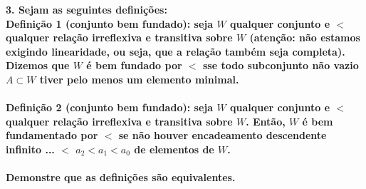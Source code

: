 \textbf{3. Sejam as seguintes definições:}
\\
\textbf{Definição 1 (conjunto bem fundado): seja $W$ qualquer conjunto e $<$ qualquer relação irreflexiva e transitiva sobre $W$ (atenção: não estamos exigindo linearidade, ou seja, que a relação também seja completa). Dizemos que $W$ é bem fundado por $<$ sse todo subconjunto não vazio $A \subset W$ tiver pelo menos um elemento minimal.} \\
\\
\textbf{Definição 2 (conjunto bem fundado): seja $W$ qualquer conjunto e $<$ qualquer relação irreflexiva e transitiva sobre $W$. Então, $W$ é bem fundamentado por $<$ se não houver encadeamento descendente infinito ... $<$ $a_2 < a_1 < a_0$ de elementos de $W$.}\\
\\
\textbf{Demonstre que as definições são equivalentes.}

